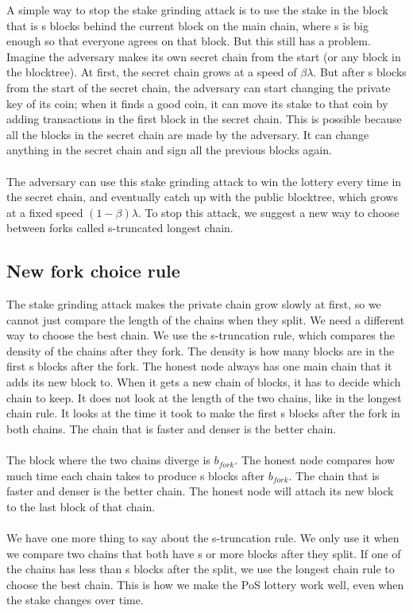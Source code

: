 \documentclass{report}
\begin{document}
A simple way to stop the stake grinding attack is to use the stake in the block that is s blocks behind the current block on the main chain, where s is big enough so that everyone agrees on that block. But this still has a problem. Imagine the adversary makes its own secret chain from the start (or any block in the blocktree). At first, the secret chain grows at a speed of $\beta\lambda$. But after s blocks from the start of the secret chain, the adversary can start changing the private key of its coin; when it finds a good coin, it can move its stake to that coin by adding transactions in the first block in the secret chain. This is possible because all the blocks in the secret chain are made by the adversary. It can change anything in the secret chain and sign all the previous blocks again.\\\\
The adversary can use this stake grinding attack to win the lottery every time in the secret chain, and eventually catch up with the public blocktree, which grows at a fixed speed $(1 - \beta)\lambda$. To stop this attack, we suggest a new way to choose between forks called s-truncated longest chain.

\subsection{New fork choice rule}
The stake grinding attack makes the private chain grow slowly at first, so we cannot just compare the length of the chains when they split. We need a different way to choose the best chain. We use the s-truncation rule, which compares the density of the chains after they fork. The density is how many blocks are in the first s blocks after the fork. The honest node always has one main chain that it adds its new block to. When it gets a new chain of blocks, it has to decide which chain to keep. It does not look at the length of the two chains, like in the longest chain rule. It looks at the time it took to make the first s blocks after the fork in both chains. The chain that is faster and denser is the better chain.\\\\
The block where the two chains diverge is $b_{fork}$. The honest node compares how much time each chain takes to produce s blocks after $b_{fork}$. The chain that is faster and denser is the better chain. The honest node will attach its new block to the last block of that chain.\\\\
We have one more thing to say about the s-truncation rule. We only use it when we compare two chains that both have s or more blocks after they split. If one of the chains has less than s blocks after the split, we use the longest chain rule to choose the best chain. This is how we make the PoS lottery work well, even when the stake changes over time.
\end{document}
